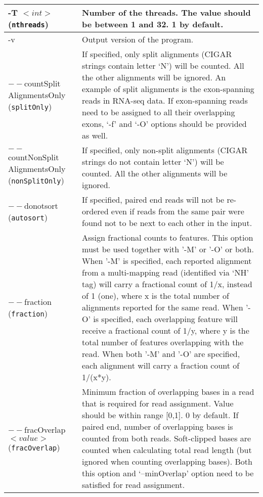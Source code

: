 \documentclass[12pt]{report}
\newcommand{\code}[1]{{\small\texttt{#1}}}
\begin{document}
\begin{longtable}{|p{5cm}|p{11cm}|}
\hline
-T $<int>$ \newline (\code{nthreads}) & Number of the threads. The value should be between 1 and 32. 1 by default.\\
\hline
-v & Output version of the program. \\
\hline
$--$countSplit \newline AlignmentsOnly \newline (\code{splitOnly}) & If specified, only split alignments (CIGAR strings contain letter `N') will be counted. All the other alignments will be ignored. An example of split alignments is the exon-spanning reads in RNA-seq data. If exon-spanning reads need to be assigned to all their overlapping exons, `-f' and `-O' options should be provided as well.\\
\hline
$--$countNonSplit  \newline AlignmentsOnly \newline (\code{nonSplitOnly}) & If specified, only non-split alignments (CIGAR strings do not contain letter `N') will be counted. All the other alignments will be ignored.\\
\hline
$--$donotsort \newline (\code{autosort}) & If specified, paired end reads will not be re-ordered even if reads from the same pair were found not to be next to each other in the input.\\
\hline
$--$fraction \newline (\code{fraction}) & Assign fractional counts to features. This option must be used together with '-M' or '-O' or both. When '-M' is specified, each reported alignment from a multi-mapping read (identified via `NH' tag) will carry a fractional count of 1/x, instead of 1 (one), where x is the total number of alignments reported for the same read. When '-O' is specified, each overlapping feature will receive a fractional count of 1/y, where y is the total number of features overlapping with the read. When both '-M' and '-O' are specified, each alignment will carry a fraction count of 1/(x*y).\\
\hline
$--$fracOverlap $<value>$ \newline (\code{fracOverlap}) & Minimum fraction of overlapping bases in a read that is required for read assignment. Value should be within range [0,1]. 0 by default. If paired end, number of overlapping bases is counted from both reads. Soft-clipped bases are counted when calculating total read length (but ignored when counting overlapping bases). Both this option and `--minOverlap' option need to be satisfied for read assignment. \\

\end{longtable}
\end{document}
